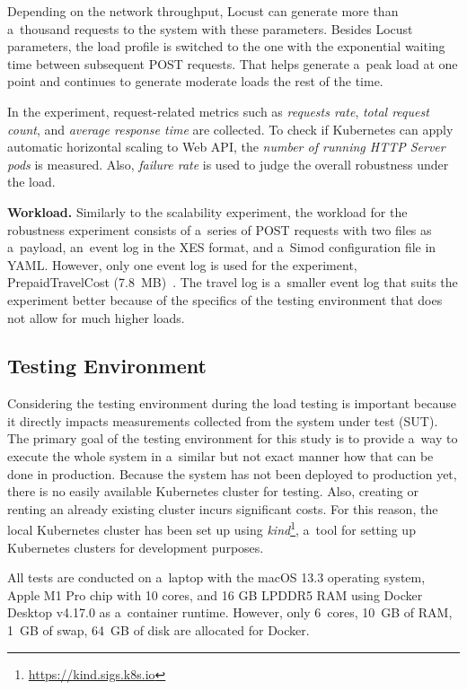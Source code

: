 \documentclass[12pt]{article}
\begin{document}
\noindent
Depending on the network throughput, Locust can generate more than a~thousand requests to the system with these parameters. Besides Locust parameters, the load profile is switched to the one with the exponential waiting time between subsequent POST requests. That helps generate a~peak load at one point and continues to generate moderate loads the rest of the time.

In the experiment, request-related metrics such as \emph{requests rate}, \emph{total request count}, and \emph{average response time} are collected. To check if Kubernetes can apply automatic horizontal scaling to Web API, the \emph{number of running HTTP Server pods} is measured. Also, \emph{failure rate} is used to judge the overall robustness under the load.

\textbf{Workload.} Similarly to the scalability experiment, the workload for the robustness experiment consists of a~series of POST requests with two files as a~payload, an~event log in the XES format, and a~Simod configuration file in YAML. However, only one event log is used for the experiment, PrepaidTravelCost (7.8~MB)~\cite{van_dongen_bpi_2020_travel}. The travel log is a~smaller event log that suits the experiment better because of the specifics of the testing environment that does not allow for much higher loads.

\subsection{Testing Environment}

Considering the testing environment during the load testing is important because it directly impacts measurements collected from the system under test (SUT). The primary goal of the testing environment for this study is to provide a~way to execute the whole system in a~similar but not exact manner how that can be done in production. Because the system has not been deployed to production yet, there is no easily available Kubernetes cluster for testing. Also, creating or renting an already existing cluster incurs significant costs. For this reason, the local Kubernetes cluster has been set up using \emph{kind}\footnote{\href{https://kind.sigs.k8s.io}{https://kind.sigs.k8s.io}}, a~tool for setting up Kubernetes clusters for development purposes.

All tests are conducted on a~laptop with the macOS 13.3 operating system, Apple M1 Pro chip with 10 cores, and 16 GB LPDDR5 RAM using Docker Desktop v4.17.0 as a~container runtime. However, only 6~cores, 10~GB of RAM, 1~GB of swap, 64~GB of disk are allocated for Docker.
\end{document}
